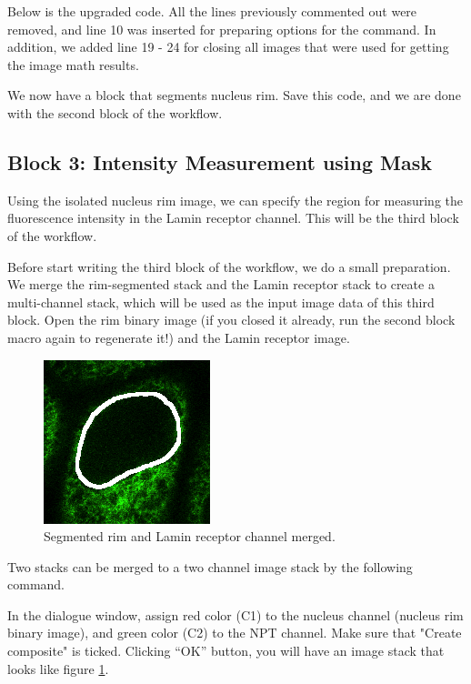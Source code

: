 Below is the upgraded code. All the lines previously commented out were removed, and line 10 was inserted for preparing options for the  command. In addition, we added line 19 - 24 for closing all images that were used for getting the image math results. 



We now have a block that segments nucleus rim. Save this code, and we are done with the second block of the workflow. 

\subsection{Block 3: Intensity Measurement using Mask}

Using the isolated nucleus rim image, we can specify the region for measuring the fluorescence intensity in the Lamin receptor channel. This will be the third block of the workflow. 

Before start writing the third block of the workflow, we do a small preparation. We merge the rim-segmented stack and the Lamin receptor stack to create a multi-channel stack, which will be used as the input image data of this third block. Open the rim binary image (if you closed it already, run the second block macro again to regenerate it!) and the Lamin receptor image.  

\begin{figure}[!ht]
\begin{center}
\includegraphics[scale=1.0]{fig/NucRimNPTMerged.png}
\caption{Segmented rim and Lamin receptor  channel merged.}
\label{fig:NucRimMerged}
\end{center}
\end{figure}

Two stacks can be merged to a two channel image stack by the following command.  


In the dialogue window, assign red color (C1) to the nucleus channel (nucleus rim binary image), and  green color (C2) to the NPT channel. Make sure that "Create composite" is ticked. Clicking ``OK'' button, you will have an image stack that looks like figure \ref{fig:NucRimMerged}.


